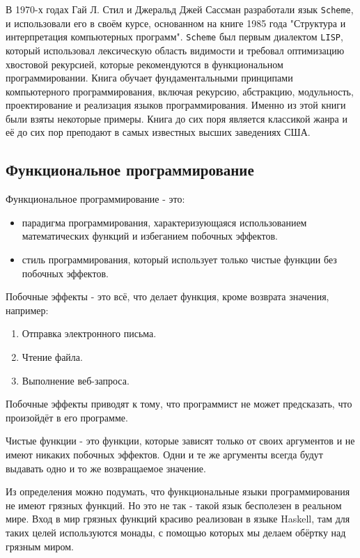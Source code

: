 В 1970-х годах Гай Л. Стил и Джеральд Джей Сассман разработали язык \texttt{Scheme}, и использовали его в своём курсе, основанном на книге 1985 года "Структура и интерпретация компьютерных программ"\cite{SICP}.
\texttt{Scheme} был первым диалектом \texttt{LISP}, который использовал лексическую область видимости и требовал оптимизацию хвостовой рекурсией, которые рекомендуются в функциональном программировании.
Книга обучает фундаментальными принципами компьютерного программирования, включая рекурсию, абстракцию, модульность, проектирование и реализация языков программирования. 
Именно из этой книги были взяты некоторые примеры.
Книга до сих поря является классикой жанра и её до сих пор преподают в самых известных высших заведениях США.

\subsection{Функциональное программирование}

Функциональное программирование - это:

\begin{itemize}
	\item парадигма программирования, характеризующаяся использованием математических функций и избеганием побочных эффектов.
	\item стиль программирования, который использует только чистые функции без побочных эффектов.
\end{itemize}

Побочные эффекты - это всё, что делает функция, кроме возврата значения, например:

\begin{enumerate}
	\item Отправка электронного письма.
	\item Чтение файла.
	\item Выполнение веб-запроса.
\end{enumerate}

Побочные эффекты приводят к тому, что программист не может предсказать, что произойдёт в его программе.

Чистые функции - это функции, которые зависят только от своих аргументов и не имеют никаких побочных эффектов.
Одни и те же аргументы всегда будут выдавать одно и то же возвращаемое значение.

Из определения можно подумать, что функциональные языки программирования не имеют грязных функций.
Но это не так - такой язык бесполезен в реальном мире.
Вход в мир грязных функций красиво реализован в языке Haskell, там для таких целей используются монады, с помощью которых мы делаем обёртку над грязным миром.


